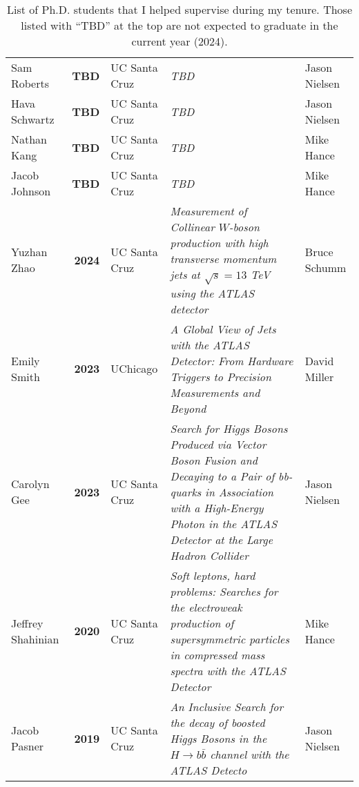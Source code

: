 \begin{table}[h!]
	\footnotesize
	\centering
	\caption{List of Ph.D. students that I helped supervise during my tenure. Those listed with \enquote{TBD} at the top are not expected to graduate in the current year (2024).}
	\begin{tabular}{l|>{\bfseries}r|l|>{\itshape}p{20em}|l}
		Sam Roberts       & TBD  & UC Santa Cruz & TBD                                                                                                                                                                                      & Jason Nielsen \\
		Hava Schwartz     & TBD  & UC Santa Cruz & TBD                                                                                                                                                                                      & Jason Nielsen \\
		Nathan Kang       & TBD  & UC Santa Cruz & TBD                                                                                                                                                                                      & Mike Hance    \\
		Jacob Johnson     & TBD  & UC Santa Cruz & TBD                                                                                                                                                                                      & Mike Hance    \\
		Yuzhan Zhao       & 2024 & UC Santa Cruz & Measurement of Collinear $W$-boson production with high transverse momentum jets at $\sqrt{s} = 13$ TeV using the ATLAS detector                                                         & Bruce Schumm  \\
		Emily Smith       & 2023 & UChicago      & A Global View of Jets with the ATLAS Detector: From Hardware Triggers to Precision Measurements and Beyond                                                                               & David Miller  \\
		Carolyn Gee       & 2023 & UC Santa Cruz & Search for Higgs Bosons Produced via Vector Boson Fusion and Decaying to a Pair of bb-quarks in Association with a High-Energy Photon in the ATLAS Detector at the Large Hadron Collider & Jason Nielsen \\
		Jeffrey Shahinian & 2020 & UC Santa Cruz & Soft leptons, hard problems: Searches for the electroweak production of supersymmetric particles in compressed mass spectra with the ATLAS Detector                                      & Mike Hance    \\
		Jacob Pasner      & 2019 & UC Santa Cruz & An Inclusive Search for the decay of boosted Higgs Bosons in the $H\to b\bar{b}$ channel with the ATLAS Detecto                                                                          & Jason Nielsen \\
	\end{tabular}
\end{table}

